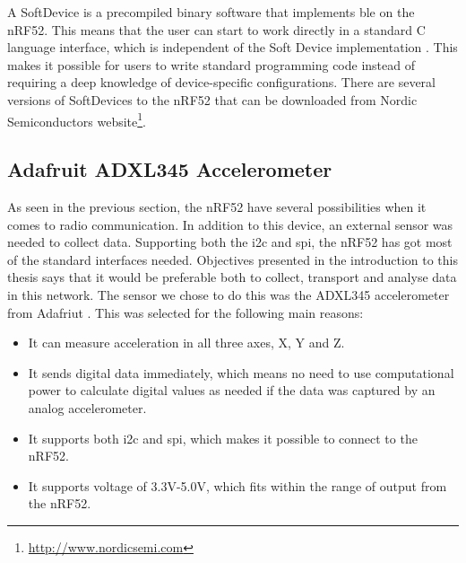 



\noindent A SoftDevice is a precompiled binary software that implements \gls{ble} on the nRF52. This means that the user can start to work directly in a standard C language interface, which is independent of the Soft Device implementation \cite{softDevice}. This makes it possible for users to write standard programming code instead of requiring a deep knowledge of device-specific configurations. There are several versions of SoftDevices to the nRF52 that can be downloaded from Nordic Semiconductors website\footnote{\url{http://www.nordicsemi.com}}. 


\subsection{Adafruit ADXL345 Accelerometer}

\noindent As seen in the previous section, the nRF52 have several possibilities when it comes to radio communication. In addition to this device, an external sensor was needed to collect data. Supporting both the \gls{i2c} and \gls{spi}, the nRF52 has got most of the standard interfaces needed. Objectives presented in the introduction to this thesis says that it would be preferable both to collect, transport and analyse data in this network. The sensor we chose to do this was the ADXL345 accelerometer from Adafriut \cite{adxlDataSheet}. This was selected for the following main reasons:  

\begin{itemize}
  \item It can measure acceleration in all three axes, X, Y and Z.
  \item It sends digital data immediately, which means no need to use computational power to calculate digital values as needed if the data was captured by an analog accelerometer. 
  \item It supports both \gls{i2c} and \gls{spi}, which makes it possible to connect to the nRF52. 
  \item It supports voltage of 3.3V-5.0V, which fits within the range of output from the nRF52.  
\end{itemize}


